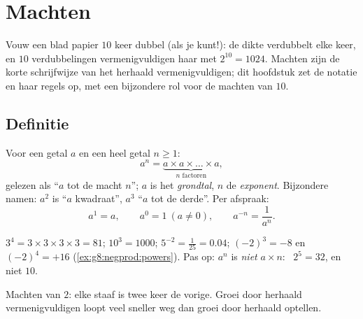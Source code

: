 \chapter{Machten}\label{ch:g8:powers}

Vouw een blad papier $10$ keer dubbel (als je kunt!): de dikte verdubbelt elke keer, en
$10$ verdubbelingen vermenigvuldigen haar met $2^{10} = 1024$. Machten zijn de korte
schrijfwijze van het herhaald vermenigvuldigen; dit hoofdstuk zet de notatie en haar
regels op, met een bijzondere rol voor de machten van $10$.

\section{Definitie}

\begin{definition}[Macht]\label{def:g8:powers:def}
Voor een getal $a$ en een heel getal $n \geq 1$:
\[
a^n = \underbrace{a \times a \times \dots \times a}_{n
\text{ factoren}},
\]
gelezen als ``$a$ tot de macht $n$''; $a$ is het \emph{grondtal}, $n$ de
\emph{exponent}. Bijzondere namen: $a^2$ is ``$a$ kwadraat'', $a^3$
``$a$ tot de derde''. Per afspraak:
\[
a^1 = a,
\qquad
a^0 = 1 \ (a \neq 0),
\qquad
a^{-n} = \frac{1}{a^n}.
\]
\end{definition}

\begin{example}\label{ex:g8:powers:def}
$3^4 = 3 \times 3 \times 3 \times 3 = 81$; \quad $10^3 = 1000$; \quad
$5^{-2} = \frac{1}{25} = 0.04$; \quad $(-2)^3 = -8$ en $(-2)^4 = +16$
(\cref{ex:g8:negprod:powers}). Pas op: $a^n$ is \emph{niet} $a \times n$: \
$2^5 = 32$, en niet $10$.
\end{example}

\begin{omfigure}

{\small Machten van $2$: elke staaf is twee keer de vorige. Groei door herhaald
vermenigvuldigen loopt veel sneller weg dan groei door herhaald optellen.}
\end{omfigure}

